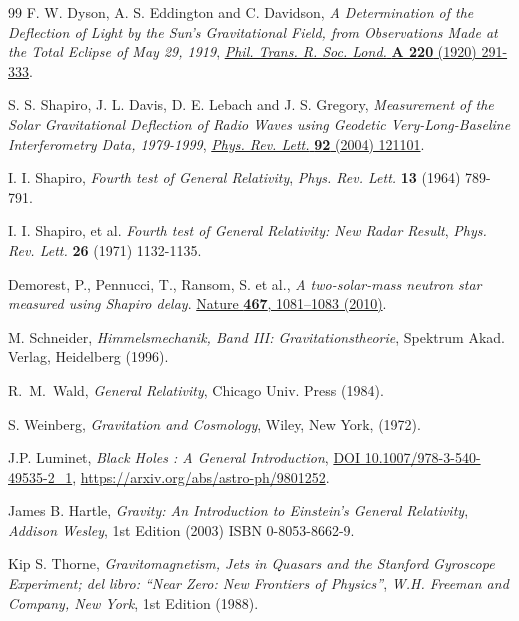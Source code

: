 \begin{thebibliography}{99}
F. W. Dyson, A. S. Eddington and C. Davidson,  \textit{A Determination of the Deflection of Light by the Sun's Gravitational Field, from Observations Made at the Total Eclipse of May 29, 1919}, \href{http://www.jstor.org/stable/91137}{  \textsl{Phil. Trans. R. Soc. Lond.}   \textbf{A 220} (1920) 291-333}.

 S. S. Shapiro, J. L. Davis, D. E. Lebach and J. S. Gregory,  \textit{Measurement of the Solar Gravitational Deflection of Radio Waves using Geodetic Very-Long-Baseline Interferometry Data, 1979-1999}, \href{http://link.aps.org/doi/10.1103/PhysRevLett.92.121101
}{  \textsl{Phys. Rev. Lett.}   \textbf{92} (2004) 121101}.

 I. I. Shapiro,   \textit{Fourth test of General Relativity},   \textsl{Phys. Rev. Lett.}   \textbf{13} (1964) 789-791.

 I. I. Shapiro, et al.  \textit{Fourth test of General Relativity: New Radar Result},   \textsl{Phys. Rev. Lett.}   \textbf{26} (1971) 1132-1135.

 Demorest, P., Pennucci, T., Ransom, S. et al., \textit{A two-solar-mass neutron star measured using Shapiro delay}. \href{https://doi.org/10.1038/nature09466}{Nature \textbf{467}, 1081–1083 (2010)}.

M. Schneider,  \textit{Himmelsmechanik, Band III:
Gravitationstheorie}, Spektrum Akad. Verlag, Heidelberg (1996).

 R.~M.~Wald,  \textit{General Relativity},  Chicago Univ. Press (1984).

 S. Weinberg,  \textit{Gravitation and Cosmology}, Wiley, New
York, (1972).

 J.P. Luminet,  \textit{Black Holes : A General Introduction}, \href{http://dx.doi.org/10.1007/978-3-540-49535-2\_1}{DOI 10.1007/978-3-540-49535-2\_1}, \url{https://arxiv.org/abs/astro-ph/9801252}.






James B. Hartle,  \textit{Gravity: An Introduction to Einstein's General Relativity},
  \textsl{Addison Wesley}, 1st Edition (2003) ISBN 0-8053-8662-9.

Kip S. Thorne,  \textit{Gravitomagnetism, Jets in Quasars and the Stanford Gyroscope Experiment; del libro: ``Near Zero: New Frontiers of Physics''},
  \textsl{W.H. Freeman and Company, New York}, 1st Edition (1988).


\end{thebibliography}
